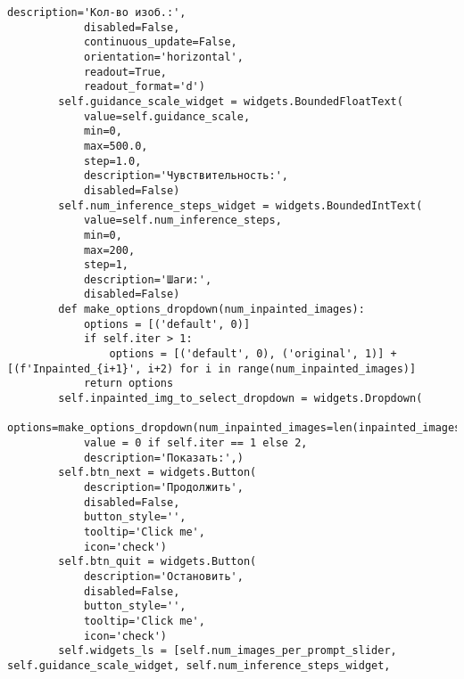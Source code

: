 \begin{lstlisting}[basicstyle=\ttfamily\small]
            description='Кол-во изоб.:',
            disabled=False,
            continuous_update=False,
            orientation='horizontal',
            readout=True,
            readout_format='d')
        self.guidance_scale_widget = widgets.BoundedFloatText(
            value=self.guidance_scale,
            min=0,
            max=500.0,
            step=1.0,
            description='Чувствительность:',
            disabled=False)
        self.num_inference_steps_widget = widgets.BoundedIntText(
            value=self.num_inference_steps,
            min=0,
            max=200,
            step=1,
            description='Шаги:',
            disabled=False)
        def make_options_dropdown(num_inpainted_images):
            options = [('default', 0)]
            if self.iter > 1:
                options = [('default', 0), ('original', 1)] + [(f'Inpainted_{i+1}', i+2) for i in range(num_inpainted_images)]
            return options
        self.inpainted_img_to_select_dropdown = widgets.Dropdown(
            options=make_options_dropdown(num_inpainted_images=len(inpainted_images_pathes)),
            value = 0 if self.iter == 1 else 2,
            description='Показать:',)
        self.btn_next = widgets.Button(
            description='Продолжить',
            disabled=False,
            button_style='',
            tooltip='Click me',
            icon='check')
        self.btn_quit = widgets.Button(
            description='Остановить',
            disabled=False,
            button_style='',
            tooltip='Click me',
            icon='check')
        self.widgets_ls = [self.num_images_per_prompt_slider, self.guidance_scale_widget, self.num_inference_steps_widget, 
        \end{lstlisting}
